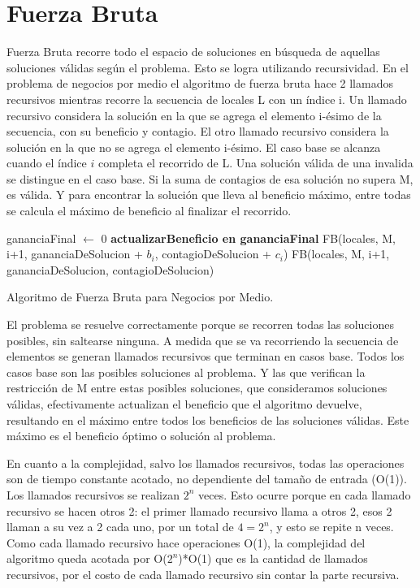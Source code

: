 \documentclass[10pt,a4paper]{article}
\begin{document}
\section{Fuerza Bruta} \label{sec:fuerza_bruta}
Fuerza Bruta recorre todo el espacio de soluciones en búsqueda de aquellas soluciones válidas según el problema. Esto se logra utilizando recursividad. En el problema de negocios por medio el algoritmo de fuerza bruta hace 2 llamados recursivos mientras recorre la secuencia de locales L con un índice i. Un llamado recursivo considera la solución en la que se agrega el elemento i-ésimo de la secuencia, con su beneficio y contagio. El otro llamado recursivo considera la solución en la que no se agrega el elemento i-ésimo. El caso base se alcanza cuando el índice $i$ completa el recorrido de L. Una solución válida de una invalida se distingue en el caso base. Si la suma de contagios de esa solución no supera M, es válida. Y para encontrar la solución que lleva al beneficio máximo, entre todas se calcula el máximo de beneficio al finalizar el recorrido. 

\begin{algorithm}
\begin{algorithmic}[1]
\State gananciaFinal $\gets$ 0 
        \State \textbf{actualizarBeneficio en gananciaFinal}
        \EndIf
    \EndIf
    \State FB(locales, M, i+1, gananciaDeSolucion + $b_i$, contagioDeSolucion + $c_i$)
    \State FB(locales, M, i+1, gananciaDeSolucion, contagioDeSolucion)
\EndFunction
\end{algorithmic}
\caption{Algoritmo de Fuerza Bruta para Negocios por Medio.}
\label{alg:fuerza_bruta}
\end{algorithm}

El problema se resuelve correctamente porque se recorren todas las soluciones posibles, sin saltearse ninguna. A medida que se va recorriendo la secuencia de elementos se generan llamados recursivos que terminan en casos base. Todos los casos base son las posibles soluciones al problema. Y las que verifican la restricción de M entre estas posibles soluciones, que consideramos soluciones válidas, efectivamente actualizan el beneficio que el algoritmo devuelve, resultando en el máximo entre todos los beneficios de las soluciones válidas. Este máximo es el beneficio óptimo o solución al problema.

En cuanto a la complejidad, salvo los llamados recursivos, todas las operaciones son de tiempo constante acotado, no dependiente del tamaño de entrada (O(1)). Los llamados recursivos se realizan $2^n$ veces. Esto ocurre porque en cada llamado recursivo se hacen otros 2: el primer llamado recursivo llama a otros 2, esos 2 llaman a su vez a 2 cada uno, por un total de $4=2^n$, y esto se repite n veces. Como cada llamado recursivo hace operaciones O(1), la complejidad del algoritmo queda acotada por O($2^n$)*O(1) que es la cantidad de llamados recursivos, por el costo de cada llamado recursivo sin contar la parte recursiva.
\end{document}
